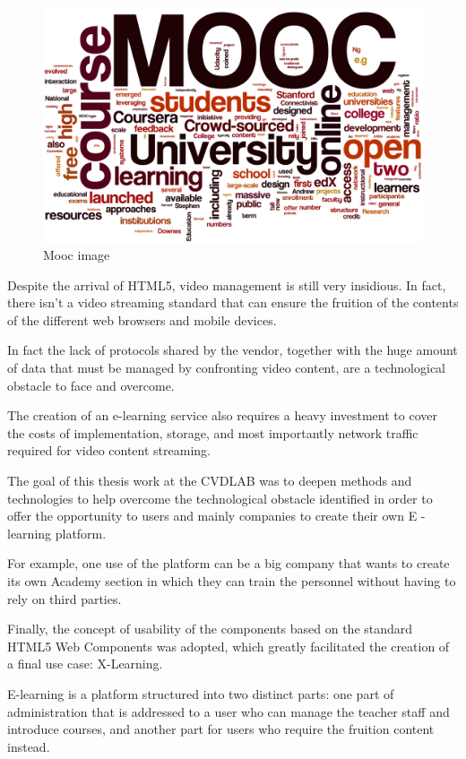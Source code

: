 \begin{figure}[htb] %
 \centering
 \includegraphics[width=0.7\linewidth]{images/introduction/mooc.png}\hfill
 \caption[Mooc image]{Mooc image}
 \label{fig:fourV}
\end{figure}


Despite the arrival of HTML5, video management is still very insidious. In fact, there isn't a video streaming standard that can ensure the fruition of the contents of the different web browsers and mobile devices.



In fact the lack of protocols shared by the vendor, together with the huge amount of data that must be managed by confronting video content, are a technological obstacle to face and overcome.

The creation of an e-learning service also requires a heavy investment to cover the costs of implementation, storage, and most importantly network traffic required for video content streaming.


The goal of this thesis work at the CVDLAB was to deepen methods and technologies to help overcome the technological obstacle identified in order to offer the opportunity to users and mainly companies to create their own E -learning platform.


For example, one use of the platform can be a big company that wants to create its own Academy section in which they can train the personnel without having to rely on third parties.

Finally, the concept of usability of the components based on the standard HTML5 Web Components was adopted, which greatly facilitated the creation of a final use case: X-Learning.


E-learning is a platform structured into two distinct parts: one part of administration that is addressed to a user who can manage the teacher staff and introduce courses, and another part for users who require the fruition content instead.


